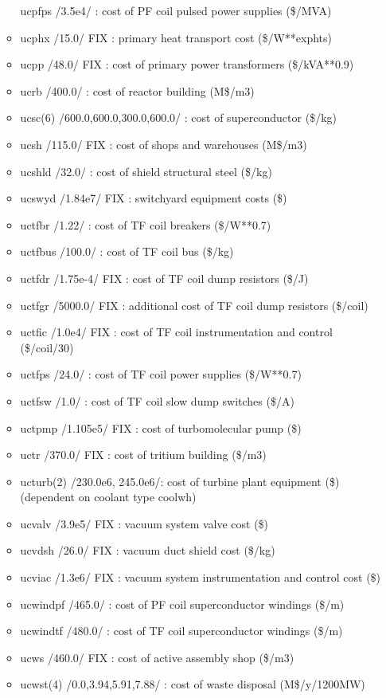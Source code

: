 \documentclass[]{article}
\begin{document}
\begin{itemize}
\begin{itemize}
    ucpfps /3.5e4/ : cost of PF coil pulsed power supplies (\$/MVA)
  \item
    ucphx /15.0/ FIX : primary heat transport cost (\$/W**exphts)
  \item
    ucpp /48.0/ FIX : cost of primary power transformers (\$/kVA**0.9)
  \item
    ucrb /400.0/ : cost of reactor building (M\$/m3)
  \item
    ucsc(6) /600.0,600.0,300.0,600.0/ : cost of superconductor (\$/kg)
  \item
    ucsh /115.0/ FIX : cost of shops and warehouses (M\$/m3)
  \item
    ucshld /32.0/ : cost of shield structural steel (\$/kg)
  \item
    ucswyd /1.84e7/ FIX : switchyard equipment costs (\$)
  \item
    uctfbr /1.22/ : cost of TF coil breakers (\$/W**0.7)
  \item
    uctfbus /100.0/ : cost of TF coil bus (\$/kg)
  \item
    uctfdr /1.75e-4/ FIX : cost of TF coil dump resistors (\$/J)
  \item
    uctfgr /5000.0/ FIX : additional cost of TF coil dump resistors
    (\$/coil)
  \item
    uctfic /1.0e4/ FIX : cost of TF coil instrumentation and control
    (\$/coil/30)
  \item
    uctfps /24.0/ : cost of TF coil power supplies (\$/W**0.7)
  \item
    uctfsw /1.0/ : cost of TF coil slow dump switches (\$/A)
  \item
    uctpmp /1.105e5/ FIX : cost of turbomolecular pump (\$)
  \item
    uctr /370.0/ FIX : cost of tritium building (\$/m3)
  \item
    ucturb(2) /230.0e6, 245.0e6/: cost of turbine plant equipment (\$)
    (dependent on coolant type coolwh)
  \item
    ucvalv /3.9e5/ FIX : vacuum system valve cost (\$)
  \item
    ucvdsh /26.0/ FIX : vacuum duct shield cost (\$/kg)
  \item
    ucviac /1.3e6/ FIX : vacuum system instrumentation and control cost
    (\$)
  \item
    ucwindpf /465.0/ : cost of PF coil superconductor windings (\$/m)
  \item
    ucwindtf /480.0/ : cost of TF coil superconductor windings (\$/m)
  \item
    ucws /460.0/ FIX : cost of active assembly shop (\$/m3)
  \item
    ucwst(4) /0.0,3.94,5.91,7.88/ : cost of waste disposal
    (M\$/y/1200MW)
  \end{itemize}


\end{itemize}
\end{document}
